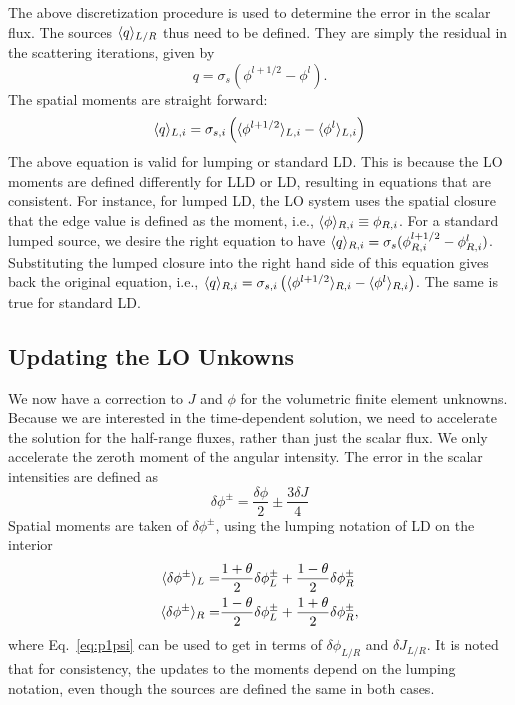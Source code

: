 The above discretization procedure is used to determine the error in the scalar flux.
The sources $\langle q \rangle_{L/R}$ thus need to be defined.  They are simply the residual in
the scattering iterations, given by
\begin{equation}
    q = \sigma_s\left(\phi^{l+1/2} - \phi^{l}\right).
\end{equation}
The spatial moments are straight forward:
\begin{equation}
    \langle q \rangle_{L,i} = \sigma_{s,i}\left(\langle \phi^{l+1/2} \rangle_{L,i} -
    \langle \phi^{l} \rangle_{L,i}\right)
\end{equation}
The above equation is valid for lumping or standard LD.  This is because the LO
moments are defined differently for LLD or LD, resulting in equations that are
consistent.  For instance, for lumped LD, the LO system uses the spatial closure that
the edge value is defined as the moment, i.e., $\langle \phi \rangle_{R,i} \equiv \phi_{R,i}$.
For a standard lumped source, we desire the right equation to have $\langle q \rangle_{R,i} =
\sigma_s(\phi^{l+1/2}_{R,i} - \phi^{l}_{R,i})$.  Substituting the lumped closure into
the right hand side of this equation gives back the original equation, i.e., $\langle q \rangle_{R,i} = \sigma_{s,i}\left(\langle \phi^{l+1/2} \rangle_{R,i} -
    \langle \phi^{l} \rangle_{R,i}\right) $.  The same is true for standard LD.

\subsection{Updating the LO Unkowns}

We now have a correction to $J$ and $\phi$ for the volumetric finite element
unknowns.
Because we are interested in the time-dependent solution, we need to accelerate the solution for the
half-range fluxes, rather than just the scalar flux. We only accelerate the zeroth
moment of the angular intensity.  The error in the scalar intensities are defined as
\begin{equation}\label{eq:p1psi}
    \delta \phi^{\pm} = \frac{\delta \phi}{2} \pm \frac{3 \delta J}{4}
\end{equation}
Spatial moments are taken of $\delta \phi^{\pm}$, using the lumping notation of LD on the interior
\begin{align}
    \langle \delta \phi^{\pm} \rangle_L =&  \frac{1+\theta}{2}\delta \phi^{\pm}_{L} +
    \frac{1-\theta}{2}\delta \phi^{\pm}_{R}  \\
    \langle \delta \phi^{\pm} \rangle_R =&  \frac{1-\theta}{2}\delta \phi^{\pm}_{L} +
    \frac{1+\theta}{2}\delta \phi^{\pm}_{R}      ,
\end{align}
where Eq.~\eqref{eq:p1psi} can be used to get in terms of $\delta \phi_{L/R}$ and $\delta J_{L/R}$.
It is noted that for consistency, the updates to the moments depend on the lumping
notation, even though the sources are defined the same in both cases.








